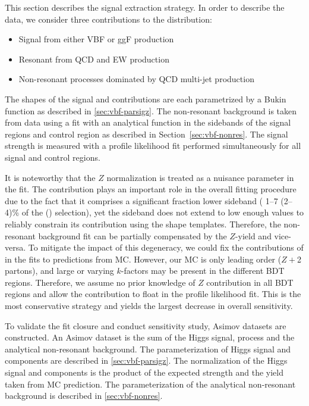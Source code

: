 This section describes the signal extraction strategy. In order to describe the data, we consider three contributions to the \Mbb{} distribution:  
\begin{itemize}
  \item Signal \Hbb from either VBF or ggF production
  \item Resonant \zjets{} from QCD and EW production
  \item Non-resonant processes dominated by QCD multi-jet production
\end{itemize}

The shapes of the signal and \zjets{} contributions are each parametrized by a Bukin function as described in \ref{sec:vbf-parsigz}. The non-resonant background is taken from data using a fit with an analytical function in the \Mbb{} sidebands of the signal regions and control region as described in Section~\ref{sec:vbf-nonres}.
The signal strength is measured with a profile likelihood fit performed simultaneously for all signal and control regions.

It is noteworthy that the $Z$ normalization is treated as a nuisance parameter in the fit. The \zjets{} contribution plays an important role in the overall fitting procedure due to the fact that it comprises a significant fraction lower \Mbb{} sideband ( 1--7 (2--4)\% of the \fourcentral(\twocentral) selection), yet the sideband does not extend to low enough \Mbb{} values to reliably constrain its contribution using the shape templates.  Therefore, the non-resonant background fit can be partially compensated by the $Z$-yield and vice-versa.  To mitigate the impact of this degeneracy, we could fix the contributions of \zjets{} in the fits to predictions from MC.  However, our \zjets{} MC is only leading order ($Z+$2 partons), and large or varying $k$-factors may be present in the different BDT regions.  Therefore, we assume no prior knowledge of $Z$ contribution in all BDT regions and allow the contribution to float in the profile likelihood fit. This is the most conservative strategy and yields the largest decrease in overall sensitivity.

To validate the fit closure and conduct sensitivity study, Asimov datasets are constructed. An Asimov dataset is the sum of the Higgs signal, \zjets{} process and the analytical non-resonant background. The parameterization of Higgs signal and \zjets{} components are described in \ref{sec:vbf-parsigz}. The normalization of the Higgs signal and \zjets{} components is the product of the expected strength and the yield taken from MC prediction. The parameterization of the analytical non-resonant background is described in \ref{sec:vbf-nonres}.

